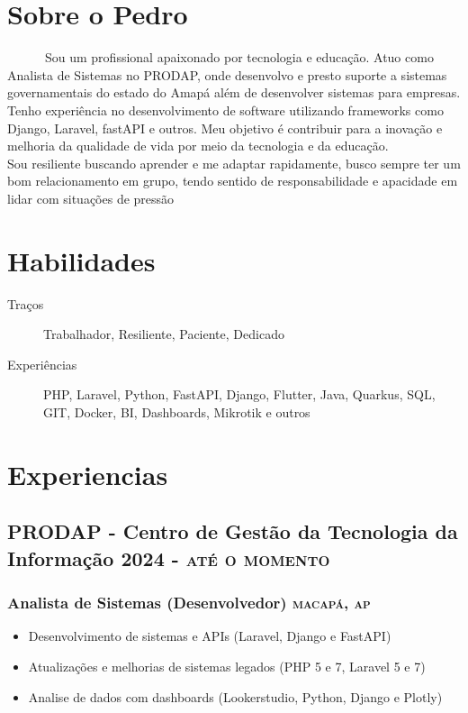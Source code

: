 \documentclass{article}
\newcommand{\rside}[1]{\hfill \normalfont\scshape\MakeLowercase{#1}}
\begin{document}
\section{\faUser\enspace Sobre o Pedro}
\begin{description}
  \item \ \ \ \ \ \  Sou um profissional apaixonado por tecnologia e educação. Atuo como Analista de Sistemas no PRODAP, onde desenvolvo e presto suporte a sistemas governamentais do estado do Amapá além de desenvolver sistemas para empresas. Tenho experiência no desenvolvimento de software utilizando frameworks como Django, Laravel, fastAPI e outros. Meu objetivo é contribuir para a inovação e melhoria da qualidade de vida por meio da tecnologia e da educação. \\ Sou resiliente buscando aprender e me adaptar rapidamente, busco sempre ter um bom relacionamento em grupo, tendo sentido de responsabilidade e apacidade em lidar com situações de pressão
\end{description}

\section{\faCogs\enspace Habilidades}
\begin{description}
  \item[Traços] Trabalhador, Resiliente, Paciente, Dedicado
  \item[Experiências] PHP, Laravel, Python, FastAPI, Django, Flutter, Java, Quarkus, SQL, GIT, Docker, BI, Dashboards, Mikrotik e outros
\end{description}

\section{\faChartPie\enspace Experiencias}

\subsection{PRODAP - Centro de Gestão da Tecnologia da Informação \rside{2024 - Até o momento}}
\subsubsection{Analista de Sistemas (Desenvolvedor)  \rside{Macapá, AP}}
\begin{itemize}
  \item Desenvolvimento de sistemas e APIs (Laravel, Django e FastAPI)
  \item Atualizações e melhorias de sistemas legados (PHP 5 e 7, Laravel 5 e 7)
  \item Analise de dados com dashboards (Lookerstudio, Python, Django e Plotly)
\end{itemize}
\end{document}
